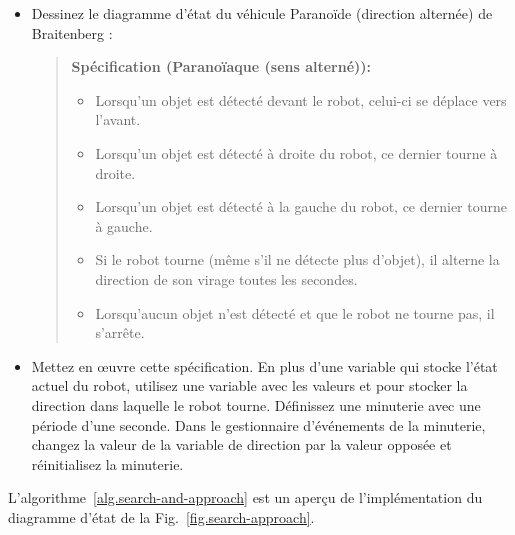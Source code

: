 \begin{framed}
\begin{itemize}
\item Dessinez le diagramme d'état du véhicule Paranoïde (direction alternée) de Braitenberg :
\begin{quote}
\normalsize\noindent\textbf{Spécification (Paranoïaque (sens alterné)):}
\begin{itemize}
\item Lorsqu'un objet est détecté devant le robot, celui-ci se déplace vers l'avant. \item Lorsqu'un objet est détecté à droite du robot, ce dernier tourne à droite. 
\item Lorsqu'un objet est détecté à la gauche du robot, ce dernier tourne à gauche. 
\item Si le robot tourne (même s'il ne détecte plus d'objet), il alterne la direction de son virage toutes les secondes.
\item Lorsqu'aucun objet n'est détecté et que le robot ne tourne pas, il s'arrête. 
\end{itemize}
\end{quote}
\item Mettez en œuvre cette spécification. En plus d'une variable qui stocke l'état actuel du robot, utilisez une variable avec les valeurs  et  pour stocker la direction dans laquelle le robot tourne. Définissez une minuterie avec une période d'une seconde. Dans le gestionnaire d'événements de la minuterie, changez la valeur de la variable de direction par la valeur opposée et réinitialisez la minuterie.
\end{itemize}
\end{framed}

L'algorithme~\ref{alg.search-and-approach} est un aperçu de l'implémentation du diagramme d'état de la Fig.~\ref{fig.search-approach}.

